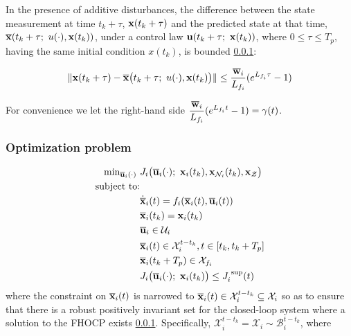 \begin{bw_box}
\begin{lemma}
  In the presence of additive disturbances, the difference between the state
  measurement at time $t_k + \tau$, $\bm{\mathbf{x}}(t_k + \tau)$ and the predicted
  state at that time, $\overline{\bm{\mathbf{x}}}(t_k + \tau;\ u(\cdot), \bm{\mathbf{x}}(t_k))$,
  under a control law $\bm{\mathbf{u}}(t_k + \tau;\ \bm{\mathbf{x}}(t_k))$, where
  $0 \leq \tau \leq T_p$, having the same initial condition $x(t_k)$, is
  bounded \ref{}:

  \begin{align}
    \|\vect{x}(t_k + \tau) - \overline{\vect{x}}\big(t_k + \tau;\ u(\cdot), \vect{x}(t_k)\big)\|
    \leq \frac{\overline{\vect{w}}_i}{L_{f_i}} (e^{L_{f_i} \tau} - 1)
  \end{align}

  \label{lemma:gamma_tau}
\end{lemma}
\end{bw_box}

For convenience we let the right-hand side
$\dfrac{\overline{\bm{\mathbf{w}}}_i}{L_{f_i}} (e^{L_{f_i} t} - 1) = \gamma(t)$.


\subsubsection{Optimization problem}

\begin{align}
  \text{min}_{\overline{\bm{\mathbf{u}}}_i (\cdot)}\ &
    J_i \big(\overline{\bm{\mathbf{u}}}_i (\cdot);\ \bm{\mathbf{x}}_i(t_k), \bm{\mathbf{x}}_{\mathcal{N}_i}(t_k), \bm{\mathbf{x}}_{\mathcal{Z}}\big) \\
  \text{subject to:} & \\
  & \dot{\overline{\bm{\mathbf{x}}}}_i(t) = f_i (\overline{\bm{\mathbf{x}}}_i (t), \overline{\bm{\mathbf{u}}}_i (t)) \\
  & \overline{\bm{\mathbf{x}}}_i (t_k) = \bm{\mathbf{x}}_i (t_k) \\
  & \overline{\bm{\mathbf{u}}}_i \in \mathcal{U}_i \\
  & \overline{\bm{\mathbf{x}}}_i (t) \in \mathcal{X}_i^{t - t_k}, t \in [t_k, t_k + T_p] \\
  & \overline{\bm{\mathbf{x}}}_i (t_k + T_p) \in \mathcal{X}_{f_i} \\
  & J_i \big(\overline{\bm{\mathbf{u}}}_i (\cdot);\ \bm{\mathbf{x}}_i(t_k)\big) \leq J_i^{\text{ sup}}(t)
\end{align}
where the constraint on $\overline{\bm{\mathbf{x}}}_i (t)$ is narrowed to
$\overline{\bm{\mathbf{x}}}_i (t) \in \mathcal{X}_i^{t - t_k} \subseteq \mathcal{X}_i$
so as to ensure that there is a robust positively invariant set for the
closed-loop system where a solution to the FHOCP exists \ref{}. Specifically,
$\mathcal{X}_i^{t - t_k} = \mathcal{X}_i \sim \mathcal{B}_i^{t-t_k}$, where

